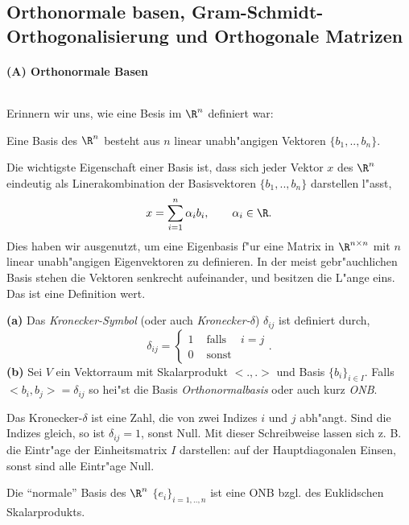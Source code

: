 \subsection{Orthonormale basen, Gram-Schmidt-Orthogonalisierung und Orthogonale Matrizen}

\paragraph{(A) Orthonormale Basen}$\quad$\par
Erinnern wir uns, wie eine Besis im $\R^n$ definiert war:\\
\begin{sdefi} Eine Basis des $\R^n$ besteht aus $n$ linear unabh"angigen 
Vektoren $\{b_1,..,b_n\}$.
\end{sdefi}
Die wichtigste Eigenschaft einer Basis ist, dass sich jeder Vektor $x$ 
des $\R^n$ eindeutig als Linerakombination der Basisvektoren $\{b_1,..,b_n\}$ darstellen l"asst, 
$$ x = \sum_{i=1}^n \alpha_i b_i,\qquad \alpha_i\in\R.$$
Dies haben wir ausgenutzt, um eine Eigenbasis f"ur eine Matrix in $\R^{n\times n}$ mit 
$n$ linear unabh"angigen Eigenvektoren zu definieren. 
In der meist gebr"auchlichen Basis stehen die Vektoren senkrecht aufeinander, 
und besitzen die L"ange eins. Das ist eine Definition wert.
\begin{sdefi} 
{\bf (a)} Das \emph{Kronecker-Symbol} (oder auch \emph{Kronecker-$\delta$}) 
$\delta_{ij}$ ist definiert durch, 
$$ \delta_{ij} = \left\{\begin{array}{ccc} 1 & \mbox{ falls }& i=j\\ 0 & \mbox{ sonst} & \end{array}\right . .$$
{\bf (b)} Sei $V$ ein Vektorraum mit Skalarprodukt $<.,.>$ und Basis $\{b_i\}_{i\in I}$.
Falls $ <b_i, b_j> = \delta_{ij}$ so hei"st  die Basis \emph{Orthonormalbasis} oder auch kurz \emph{ONB}. 
\end{sdefi}
Das Kronecker-$\delta$ ist eine Zahl, die von zwei Indizes $i$ und $j$ abh"angt.
Sind die Indizes gleich, so ist $\delta_{ij} = 1$, sonst Null. Mit dieser
Schreibweise lassen sich z. B. die Eintr"age der Einheitsmatrix $I$ darstellen:
auf der Hauptdiagonalen Einsen, sonst sind alle Eintr"age Null.

\begin{bspX}
Die ``normale'' Basis des $\R^n$ $\{e_i\}_{i=1,..,n}$ ist 
eine ONB bzgl. des Euklidschen Skalarprodukts.
\end{bspX}



